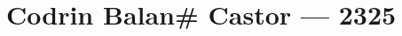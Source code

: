 \hypertarget{codrin-balan-castor-2325}{%
\chapter{Codrin Balan\# Castor — 2325}\label{codrin-balan-castor-2325}}
